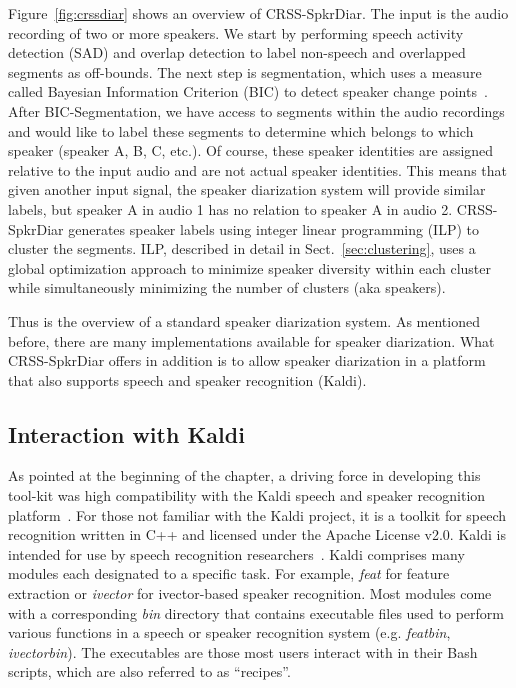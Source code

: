 Figure~\ref{fig:crssdiar} shows an overview of CRSS-SpkrDiar. 
The input is the audio recording of two or more speakers. 
We start by performing speech activity detection (SAD) and overlap detection to label non-speech and overlapped segments as off-bounds. 
The next step is segmentation, which uses a measure called Bayesian Information Criterion (BIC) to detect speaker change points~\cite{chen1998BIC}. 
After BIC-Segmentation, we have access to segments within the audio recordings and would like to label these segments to determine which belongs to which speaker (speaker A, B, C, etc.). 
Of course, these speaker identities are assigned relative to the input audio and are not actual speaker identities. 
This means that given another input signal, the speaker diarization system will provide similar labels, but speaker A in audio 1 has no relation to speaker A in audio 2. 
CRSS-SpkrDiar generates speaker labels using integer linear programming (ILP) to cluster the segments. 
ILP, described in detail in Sect.~\ref{sec:clustering}, uses a global optimization approach to minimize speaker diversity within each cluster while simultaneously minimizing the number of clusters (aka speakers). 

Thus is the overview of a standard speaker diarization system. 
As mentioned before, there are many implementations available for speaker diarization. 
What CRSS-SpkrDiar offers in addition is to allow speaker diarization in a platform that also supports speech and speaker recognition (Kaldi). 


\subsection{Interaction with Kaldi}
\label{ssec:crssdiar_and_kaldi}

As pointed at the beginning of the chapter, a driving force in developing this tool-kit was high compatibility with the Kaldi speech and speaker recognition platform~\cite{kaldi}. 
For those not familiar with the Kaldi project, it is a toolkit for speech recognition written in C++ and licensed under the Apache License v2.0. Kaldi is intended for use by speech recognition researchers~\cite{kaldi}. 
Kaldi comprises many modules each designated to a specific task. For example, {\it feat} for feature extraction or {\it ivector} for ivector-based speaker recognition. 
Most modules come with a corresponding {\it bin} directory  that contains executable files used to perform various functions in a speech or speaker recognition system (e.g. {\it featbin}, {\it ivectorbin}). 
The executables are those most users interact with in their Bash scripts, which are also referred to as ``recipes''. 

